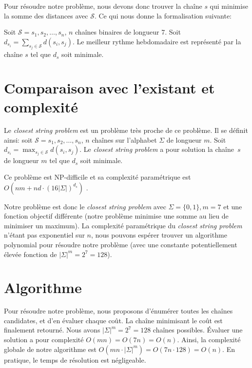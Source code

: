 \documentclass{roadef}
\def\S{\mathcal{S}}
\begin{document}
Pour résoudre notre problème, nous devons donc trouver la chaîne $s$
qui minimise la somme des distances avec $\S$. Ce qui nous donne la
formalisation suivante:

Soit $\S = s_1, s_2, \ldots, s_n$, $n$ chaînes binaires de
longueur 7. Soit
\begin{math}
  d_{s_i} = \sum_{s_j\in\S} d(s_i, s_j)
\end{math}.
Le meilleur rythme hebdomadaire est représenté par la chaîne $s$ tel
que $d_s$ soit minimale.

\section{Comparaison avec l'existant et complexité}

Le \emph{closest string problem} est un problème très proche de ce
problème.  Il se définit ainsi: soit $\S = s_1, s_2, \ldots, s_n$, $n$
chaînes sur l'alphabet $\Sigma$ de longueur $m$.  Soit $d_{s_i} =
\max_{s_j\in\S} d(s_i, s_j)$. Le \emph{closest string problem} a pour
solution la chaîne~$s$ de longueur $m$ tel que $d_s$ soit minimale.

Ce problème est NP-difficile \cite{lanctot2003distinguishing} et sa
complexité paramétrique est
\begin{math}
  O(nm + nd\cdot(16|\Sigma|)^{d_s})
\end{math}
\cite{ma2008more}.

Notre problème est donc le \emph{closest string problem} avec $\Sigma
= \{0, 1\}, m = 7$ et une fonction objectif différente (notre problème
minimise une somme au lieu de minimiser un maximum). La complexité
paramétrique du \emph{closest string problem} n'étant pas exponentiel
sur $n$, nous pouvons espérer trouver un algorithme polynomial pour
résoudre notre problème (avec une constante potentiellement élevée
fonction de $|\Sigma|^m = 2^7 = 128$).

\section{Algorithme}

Pour résoudre notre problème, nous proposons d'énumérer toutes les
chaînes candidates, et d'en évaluer chaque coût.  La chaîne minimisant le
coût est finalement retourné. Nous avons $|\Sigma|^m = 2^7 = 128$
chaînes possibles. Évaluer une solution a pour complexité $O(mn) =
O(7n) = O(n)$. Ainsi, la complexité globale de notre algorithme est
$O(mn\cdot|\Sigma|^m) = O(7n\cdot128) = O(n)$. En pratique, le temps
de résolution est négligeable.
\end{document}
